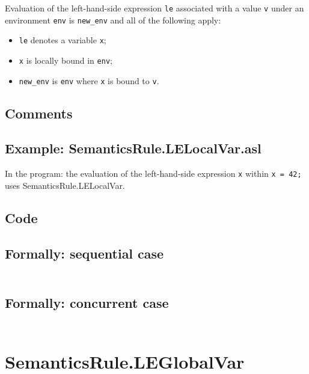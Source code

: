 \documentclass{book}
\begin{document}
    Evaluation of the left-hand-side expression \texttt{le} associated with a
value \texttt{v} under an environment \texttt{env} is \texttt{new\_env} and all
of the following apply:
    \begin{itemize}
    \item \texttt{le} denotes a variable \texttt{x};
    \item \texttt{x} is locally bound in \texttt{env};
    \item \texttt{new\_env} is \texttt{env} where \texttt{x} is bound to \texttt{v}.
    \end{itemize}

  \subsection{Comments}

    \subsection{Example: SemanticsRule.LELocalVar.asl}
    In the program:
    the evaluation of the left-hand-side expression \texttt{x} within \texttt{x = 42;} uses SemanticsRule.LELocalVar.

  \subsection{Code}

  \subsection{Formally: sequential case}
  \begin{align}
  \end{align} 

  \subsection{Formally: concurrent case}
  \begin{align}
  \end{align} 

\section{SemanticsRule.LEGlobalVar \label{sec:SemanticsRule.LEGlobalVar}}
\end{document}
